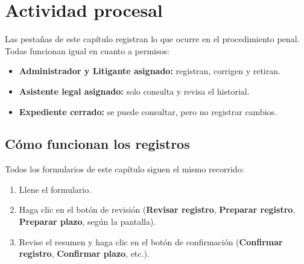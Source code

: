 \chapter{Actividad procesal}\label{cap:actividad-procesal}

Las pestañas de este capítulo registran lo que ocurre en el procedimiento
penal. Todas funcionan igual en cuanto a permisos:

\begin{itemize}
  \item \textbf{Administrador y Litigante asignado:} registran, corrigen y
        retiran.
  \item \textbf{Asistente legal asignado:} solo consulta y revisa el
        historial.
  \item \textbf{Expediente cerrado:} se puede consultar, pero no registrar
        cambios.
\end{itemize}


\section{Cómo funcionan los registros}\label{sec:patron-registros}

Todos los formularios de este capítulo siguen el mismo recorrido:

\begin{enumerate}
  \item Llene el formulario.
  \item Haga clic en el botón de revisión (\textbf{Revisar registro},
        \textbf{Preparar registro}, \textbf{Preparar plazo}, según la
        pantalla).
  \item Revise el resumen y haga clic en el botón de confirmación
        (\textbf{Confirmar registro}, \textbf{Confirmar plazo}, etc.).
\end{enumerate}

